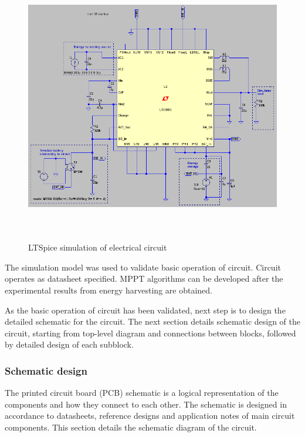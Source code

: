 \begin{figure}[htb]
\begin{center}
\includegraphics[height=12cm]{images/own_dwg/ltspice_ltc3331.jpg}
\end{center}
\caption{\label{fig:ltspice_sim} LTSpice \cite{ltspice} simulation of electrical circuit}
\end{figure}

The simulation model was used to validate basic operation of circuit. Circuit operates as datasheet specified. MPPT algorithms can be developed after the experimental results from energy harvesting are obtained. 

As the basic operation of circuit has been validated, next step is to design the detailed schematic for the circuit. The next section details schematic design of the circuit, starting from top-level diagram and connections between blocks, followed by detailed design of each subblock. 

\subsubsection{Schematic design}
The printed circuit board (PCB) schematic is a logical representation of the components and how they connect to each other. The schematic is designed in accordance to datasheets, reference designs and application notes of main circuit components. This section details the schematic diagram of the circuit.

